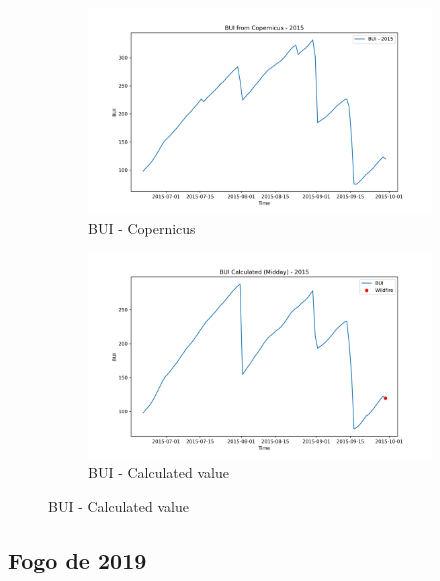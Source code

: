 \begin{figure}[h]
	\caption{Comparison of BUI calculated values and Copernicus at midday}
	\centering
	\begin{subfigure}{0.49\textwidth}
		\centering
		\includegraphics[width=\textwidth]{graphs/2015/2015CopernicusBUI12.png}
		\caption{BUI - Copernicus}
		\label{fig:bui_copernicus_2015_midday}
	\end{subfigure}
	\hfill
	\begin{subfigure}{0.49\textwidth}
		\centering
		\includegraphics[width=\textwidth]{graphs/2015/2015CalcBUI12.png}
		\caption{BUI - Calculated value}
		\label{fig:bui_calculated_2015_midday}
	\end{subfigure}
	\label{fig:comparison_bui_midday_copernicus_calculated}
\end{figure}

\FloatBarrier

\subsection{Fogo de 2019}


